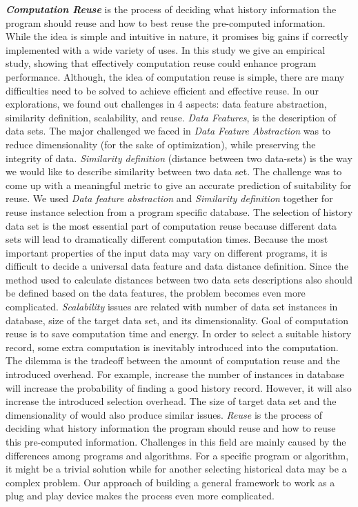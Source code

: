 \textbf{\textit{Computation Reuse}} is the process of deciding what history information the program should reuse and how to best reuse the pre-computed information.
While the idea is simple and intuitive in nature, it promises big gains if correctly implemented with a wide variety of uses.
In this study we give an empirical study, showing that effectively computation reuse could enhance program performance.
Although, the idea of computation reuse is simple, there are many difficulties need to be solved to achieve efficient and effective reuse. 
In our explorations, we found out challenges in 4 aspects: data feature abstraction, similarity definition, scalability, and reuse. 
\textit{Data Features}, is the description of data sets. The major challenged we faced in \textit{Data Feature Abstraction} was to reduce dimensionality (for the sake of optimization), while preserving the integrity of data.
\textit{Similarity definition} (distance between two data-sets) is the way we would like to describe similarity between two data set. The challenge was to come up with a meaningful metric to give an accurate prediction of suitability for reuse. 
We used \textit{Data feature abstraction} and \textit{Similarity definition} together for reuse instance selection from a program specific database. The selection of history data set is the most essential part of computation reuse because different data sets will lead to dramatically different computation times. Because the most important properties of the input data may vary on different programs, it is difficult to decide a universal data feature and data distance definition. Since the method used to calculate distances between two data sets descriptions also should be defined based on the data features, the problem becomes even more complicated. 
\textit{Scalability} issues are related with number of data set instances in database, size of the target data set, and its dimensionality. Goal of computation reuse is to save computation time and energy. In order to select a suitable history record, some extra computation is inevitably introduced into the computation. The dilemma is the tradeoff between the amount of computation reuse and the introduced overhead. For example, increase the number of instances in database will increase the probability of finding a good history record. However, it will also increase the introduced selection overhead. The size of target data set and the dimensionality of would also produce similar issues.
\textit{Reuse} is the process of deciding what history information the program should reuse and how to reuse this pre-computed information. Challenges in this field are mainly caused by the differences among programs and algorithms. For a specific program or algorithm, it might be a trivial solution while for another selecting historical data may be a complex problem. Our approach of building a general framework to work as a plug and play device makes the process even more complicated. 
